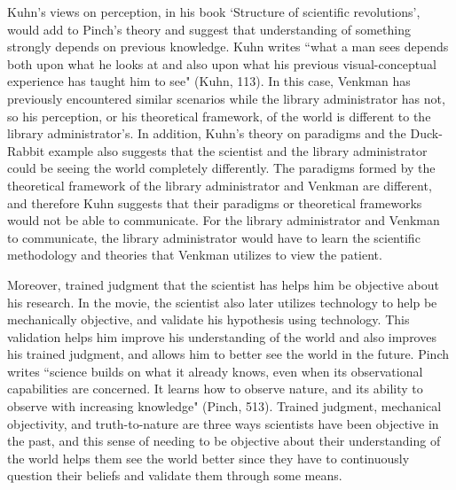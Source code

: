 \documentclass[11pt, oneside]{article}
\begin{document}
\par Kuhn's views on perception, in his book `Structure of scientific revolutions', would add to Pinch's theory and suggest that understanding of something strongly depends on previous knowledge. Kuhn writes ``what a man sees depends both upon what he looks at and also upon what his previous visual-conceptual experience has taught him to see" (Kuhn, 113). In this case, Venkman has previously encountered similar scenarios while the library administrator has not, so his perception, or his theoretical framework, of the world is different to the library administrator's. In addition, Kuhn's theory on paradigms and the Duck-Rabbit example also suggests that the scientist and the library administrator could be seeing the world completely differently. The paradigms formed by the theoretical framework of the library administrator and Venkman are different, and therefore Kuhn suggests that their paradigms or theoretical frameworks would not be able to communicate. For the library administrator and Venkman to communicate, the library administrator would have to learn the scientific methodology and theories that Venkman utilizes to view the patient.



\par Moreover, trained judgment that the scientist has helps him be objective about his research. In the movie, the scientist also later utilizes technology to help be mechanically objective, and validate his hypothesis using technology. This validation helps him improve his understanding of the world and also improves his trained judgment, and allows him to better see the world in the future. Pinch writes ``science builds on what it already knows, even when its observational capabilities are concerned. It learns how to observe nature, and its ability to observe with increasing knowledge" (Pinch, 513). Trained judgment, mechanical objectivity, and truth-to-nature are three ways scientists have been objective in the past, and this sense of needing to be objective about their understanding of the world helps them see the world better since they have to continuously question their beliefs and validate them through some means. 

\end{document}
